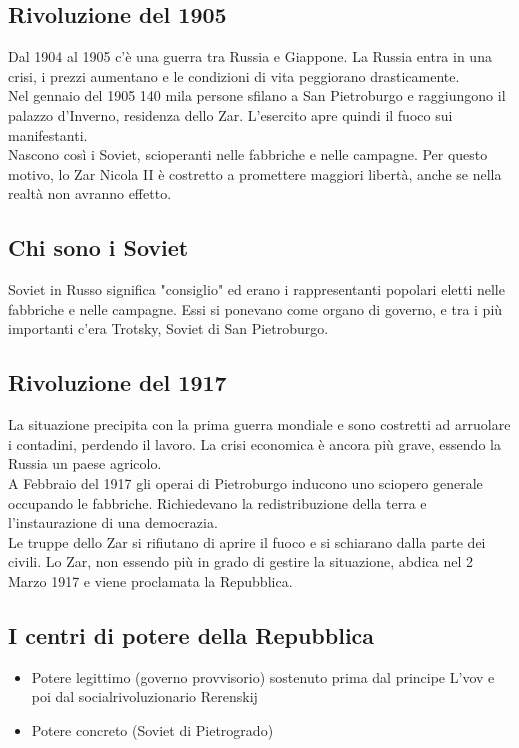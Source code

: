 \documentclass{article}
\begin{document}
\subsection{Rivoluzione del 1905}
Dal 1904 al 1905 c'è una guerra tra Russia e Giappone. La Russia entra in una crisi,
i prezzi aumentano e le condizioni di vita peggiorano drasticamente.\\
Nel gennaio del 1905 140 mila persone sfilano a San Pietroburgo e raggiungono il palazzo
d'Inverno, residenza dello Zar. L'esercito apre quindi il fuoco sui manifestanti.\\
Nascono così i Soviet, scioperanti nelle fabbriche e nelle campagne. Per questo motivo,
lo Zar Nicola II è costretto a promettere maggiori libertà, anche se nella realtà non
avranno effetto.

\subsection{Chi sono i Soviet}
Soviet in Russo significa "consiglio" ed erano i rappresentanti popolari eletti
nelle fabbriche e nelle campagne. Essi si ponevano come organo di governo, e tra
i più importanti c'era Trotsky, Soviet di San Pietroburgo.

\subsection{Rivoluzione del 1917}
La situazione precipita con la prima guerra mondiale e sono costretti ad arruolare i
contadini, perdendo il lavoro. La crisi economica è ancora più grave, essendo la Russia
un paese agricolo.\\
A Febbraio del 1917 gli operai di Pietroburgo inducono uno sciopero generale
occupando le fabbriche. Richiedevano la redistribuzione della terra e l'instaurazione
di una democrazia.\\
Le truppe dello Zar si rifiutano di aprire il fuoco e si schiarano dalla parte dei civili.
Lo Zar, non essendo più in grado di gestire la situazione, abdica nel 2 Marzo 1917 e viene
proclamata la Repubblica.\\

\subsection{I centri di potere della Repubblica}
\begin{itemize}
    \item Potere legittimo (governo provvisorio) sostenuto prima dal principe L'vov e poi dal socialrivoluzionario Rerenskij
    \item Potere concreto (Soviet di Pietrogrado)
\end{itemize}
\end{document}
